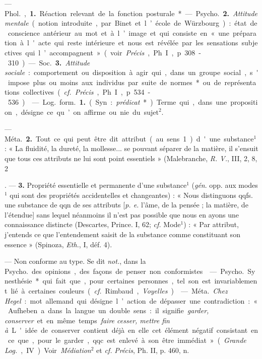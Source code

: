 \begin{itemize}[leftmargin=1cm, label=, itemsep=1pt]
{{ — \si{Phol.}, {\bf 1.} Réaction relevant de la fonction posturale*.

— \si{Psycho.} {\bf 2.} {\it Attitude mentale}
(notion introduite, par Binet et
l’école de Würzbourg) : état de conscience antérieur au mot et à l’image
et qui consiste en « une préparation
à l'acte qui reste intérieure et nous
est révélée par les sensations subjectives qui l’accompagnent » (voir
{\it Précis}, Ph. I, p. 308-310).

— \si{Soc.} {\bf 3.} {\it Attitude sociale} : comportement ou disposition à agir qui,
dans un groupe social, s'impose plus
ou moins aux individus par suite de
normes* ou de représentations collectives ({\it cf.}  {\it Précis}, Ph. I, p. 534-536).

 — \si{Log.} \si{form.} {\bf 1.} (Syn. : {\it prédicat}*). Terme qui, dans
une proposition, désigne ce qu’on affirme
ou nie du sujet$^2$.

— \si{Méta.} {\bf 2.} Tout ce qui peut être
dit attribut (au sens 1) d'une substance$^1$ : « La fluidité, la dureté, la
mollesse... se pouvant séparer de la
matière, il s'ensuit que tous ces
attributs ne lui sont point essentiels » (Malebranche, {\it R. V.}, III, 2,
8, 2}. — {\bf 3.} Propriété essentielle et
permanente d’une substance$^1$ ({\it gén}.
opp. aux modes$^1$ qui sont des propriétés accidentelles et changeantes) :
« Nous distinguons qqfs. une substance de qqn de ses attributs [{\it p. e.}
l'âme, de la pensée ; la matière, de
l'étendue] sans lequel néanmoins il
n’est pas possible que nous en ayons
une connaissance distincte (Descartes, Prince. I, 62; {\it cf.}  Mode$^1$) :
« Par attribut, j'entends ce que
l’entendement saisit de la substance
comme constituant son essence »
(Spinoza, {\it Eth.}, I, déf. 4).

 — Non conforme au type.
Se dit {\it not.}, dans la \si{Psycho.} des opinions, des façons de penser non
conformistes.

 — \si{Psycho.} Synesthésie* qui fait que, pour certaines
personnes, tel son est invariablement lié à certaines couleurs ({\it cf.} 
Rimbaud, {\it Voyelles}).

 — \si{Méta.} {\it Chez Hegel} : mot
allemand qui désigne l’action de
dépasser une contradiction : « Aufheben a dans la langue un double
sens : il signifie {\it garder, conserver} et
en même temps {\it faire cesser, mettre
fin à}. L'idée de conserver contient
déjà en elle cet élément négatif
consistant en ce que, pour le garder,
qqc est enlevé à son être immédiat »
({\it Grande \si{Log.}}, IV). Voir {\it Médiation}$^2$
et {\it cf.}  {\it Précis}, Ph. II, p. 460, n.

}
\end{itemize}
